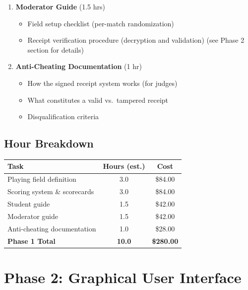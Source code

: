 \documentclass[a4paper]{article}
\begin{document}
\begin{enumerate}[leftmargin=*]
    \item \textbf{Moderator Guide} (1.5 hrs)
    \begin{itemize}
        \item Field setup checklist (per-match randomization)
        \item Receipt verification procedure (decryption and validation) (see Phase 2 section for details)
    \end{itemize}

    \item \textbf{Anti-Cheating Documentation} (1 hr)
    \begin{itemize}
        \item How the signed receipt system works (for judges)
        \item What constitutes a valid vs.\ tampered receipt
        \item Disqualification criteria
    \end{itemize}
\end{enumerate}

\subsection*{Hour Breakdown}

\begin{center}
\begin{tabular}{lcc}
\toprule
\textbf{Task} & \textbf{Hours (est.)} & \textbf{Cost} \\
\midrule
Playing field definition & 3.0 & \$84.00 \\
Scoring system \& scorecards & 3.0 & \$84.00 \\
Student guide & 1.5 & \$42.00 \\
Moderator guide & 1.5 & \$42.00 \\
Anti-cheating documentation & 1.0 & \$28.00 \\
\midrule
\textbf{Phase 1 Total} & \textbf{10.0} & \textbf{\$280.00} \\
\bottomrule
\end{tabular}
\end{center}

\section*{Phase 2: Graphical User Interface}
\end{document}
